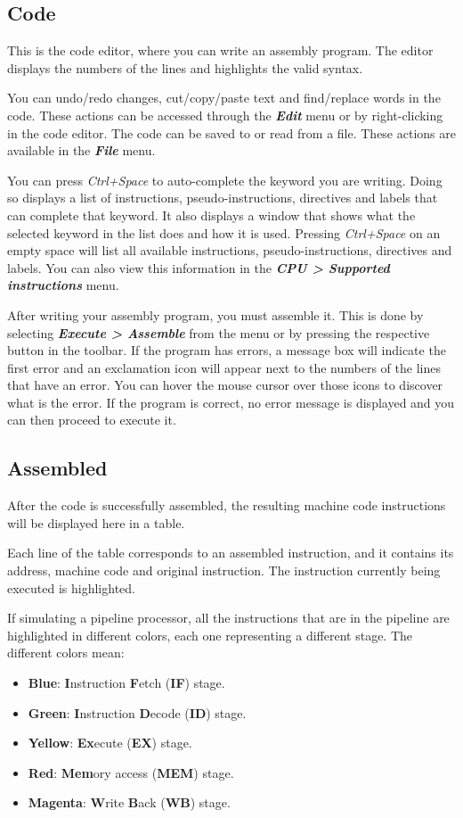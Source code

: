 \documentclass[11pt,a4paper,twoside,titlepage]{article}
\newcommand{\menupath}[1]{\textbf{\emph{#1}}}
\begin{document}
\subsection{Code}

This is the code editor, where you can write an assembly program.
The editor displays the numbers of the lines and highlights the valid syntax.

You can undo/redo changes, cut/copy/paste text and find/replace words in the
code. These actions can be accessed through the \menupath{Edit} menu or by
right-clicking in the code editor.
The code can be saved to or read from a file. These actions are available in
the \menupath{File} menu.

You can press \emph{Ctrl+Space} to auto-complete the keyword you are writing.
Doing so displays a list of instructions, pseudo-instructions, directives and
labels that can complete that keyword.
It also displays a window that shows what the selected keyword in the list does
and how it is used.
Pressing \emph{Ctrl+Space} on an empty space will list all available
instructions, pseudo-instructions, directives and labels.
You can also view this information in the 
\menupath{CPU > Supported instructions} menu.

After writing your assembly program, you must assemble it.
This is done by selecting \menupath{Execute > Assemble} from the menu or by
pressing the respective button in the toolbar.
If the program has errors, a message box will indicate the first error and an
exclamation icon will appear next to the numbers of the lines that have an
error.
You can hover the mouse cursor over those icons to discover what is the error.
If the program is correct, no error message is displayed and you can then
proceed to execute it.


\subsection{Assembled} \label{sec:assembled}

After the code is successfully assembled, the resulting machine code 
instructions will be displayed here in a table.

Each line of the table corresponds to an assembled instruction, and it
contains its address, machine code and original instruction.
The instruction currently being executed is highlighted.

If simulating a pipeline processor, all the instructions that are in the
pipeline are highlighted in different colors, each one representing a
different stage.
The different colors mean:
\begin{itemize}
	\item \textbf{Blue}: \textbf{I}nstruction \textbf{F}etch (\textbf{IF}) stage.
	\item \textbf{Green}: \textbf{I}nstruction \textbf{D}ecode (\textbf{ID}) stage.
	\item \textbf{Yellow}: \textbf{Ex}ecute (\textbf{EX}) stage.
	\item \textbf{Red}: \textbf{Mem}ory access (\textbf{MEM}) stage.
	\item \textbf{Magenta}: \textbf{W}rite \textbf{B}ack (\textbf{WB}) stage.
\end{itemize}
\end{document}
